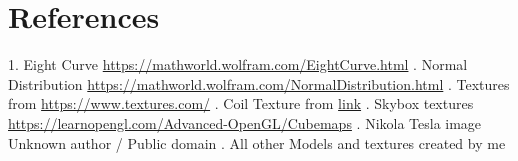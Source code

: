 \documentclass[10pt, oneside]{article}   	%
\begin{document}
\section{References}
1. Eight Curve \textcolor{blue}{\url{https://mathworld.wolfram.com/EightCurve.html}} . Normal Distribution \textcolor{blue}{\url{https://mathworld.wolfram.com/NormalDistribution.html}}
. Textures from \textcolor{blue}{\url{https://www.textures.com/}}  %
. Coil Texture from \textcolor{blue}{\href{http://polymericinsulators.m.sell.fnxradio.com/pz6904fc0-film-sintering-enamel-coated-copper-wire-for-motor-winding-high-power.html}{link}}
. Skybox textures  \textcolor{blue}{\url{https://learnopengl.com/Advanced-OpenGL/Cubemaps}}
. Nikola Tesla image Unknown author / Public domain
. All other Models and textures created by me
\end{document}
